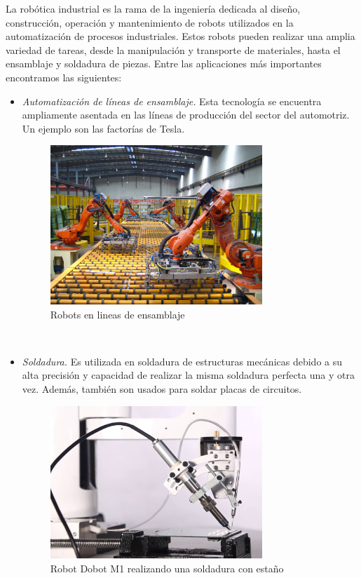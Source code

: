 La robótica industrial es la rama de la ingeniería dedicada al diseño, construcción, operación y mantenimiento 
de robots utilizados en la automatización de procesos industriales. Estos robots pueden realizar una amplia variedad 
de tareas, desde la manipulación y transporte de materiales, hasta el ensamblaje y soldadura de piezas. Entre las aplicaciones 
más importantes encontramos las siguientes:

\begin{itemize}
  \item \textit{Automatización de líneas de ensamblaje.} Esta tecnología se encuentra ampliamente asentada en las líneas de  producción 
                                                        del sector del automotriz. Un ejemplo son las factorías de Tesla.  
  \begin{figure} [h!]
    \begin{center}
      \includegraphics[width=8cm]{figs/industrial_robot.jpg}
    \end{center}
    \caption{Robots en lineas de ensamblaje}
    \label{fig:robIndustrialChain}
  \end{figure}\   

  \item \textit{Soldadura.} Es utilizada en soldadura de estructuras mecánicas debido a su alta precisión y capacidad de realizar 
                            la misma soldadura perfecta una y otra vez. Además, también son usados para soldar placas de circuitos.
  \begin{figure} [h!]
    \begin{center}
      \includegraphics[width=8cm]{figs/solder_robot.jpg}
    \end{center}
    \caption{Robot Dobot M1 realizando una soldadura con estaño}
    \label{fig:robSoldering}
  \end{figure}\ 


\end{itemize}
